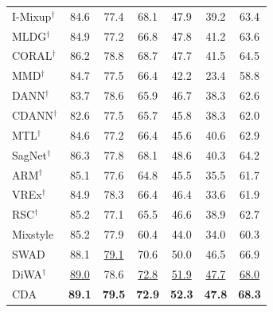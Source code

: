\documentclass[10pt]{article}
\begin{document}
\begin{table}[H]
\begin{tabular}{lccccc|c}
I-Mixup$^\dagger$    & 84.6          & 77.4          & 68.1                & 47.9              & 39.2               & 63.4           \\
MLDG$^\dagger$     & 84.9          & 77.2          & 66.8                & 47.8              & 41.2               & 63.6           \\
CORAL$^\dagger$    & 86.2          & 78.8          & 68.7                & 47.7              & 41.5               & 64.5           \\
MMD$^\dagger$      & 84.7          & 77.5          & 66.4                & 42.2              & 23.4               & 58.8           \\
DANN$^\dagger$     & 83.7          & 78.6          & 65.9                & 46.7              & 38.3               & 62.6           \\
CDANN$^\dagger$    & 82.6          & 77.5          & 65.7                & 45.8              & 38.3               & 62.0           \\
MTL$^\dagger$      & 84.6          & 77.2          & 66.4                & 45.6              & 40.6               & 62.9           \\
SagNet$^\dagger$   & 86.3          & 77.8          & 68.1                & 48.6              & 40.3               & 64.2           \\
ARM$^\dagger$      & 85.1          & 77.6          & 64.8                & 45.5              & 35.5               & 61.7           \\
VREx$^\dagger$     & 84.9          & 78.3          & 66.4                & 46.4              & 33.6               & 61.9           \\
RSC$^\dagger$      & 85.2          & 77.1          & 65.5                & 46.6              & 38.9               & 62.7           \\
Mixstyle           & 85.2          & 77.9          & 60.4                & 44.0              & 34.0               & 60.3           \\
SWAD               & 88.1          & \underline{79.1}          & 70.6                & 50.0              & 46.5               & 66.9           \\
DiWA$^\dagger$     & \underline{89.0}          & 78.6          & \underline{72.8}                & \underline{51.9}              & \underline{47.7}               & \underline{68.0}           \\ \midrule
CDA    & \textbf{89.1} & \textbf{79.5} & \textbf{72.9} & \textbf{52.3} & \textbf{47.8} & \textbf{68.3} \\
\bottomrule
\end{tabular}
\end{table}
\end{document}
